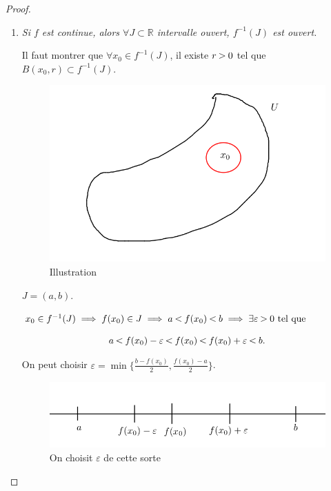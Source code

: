 \documentclass[french]{article}
\newcommand{\lesss}{\rotatebox[origin=c]{90}{$\land$}}
\newcommand{\less}{\ \lesss\ }
\newcommand{\biggg}{\rotatebox[origin=c]{90}{$\lor$}}
\newcommand{\bg}{\ \biggg\ }
\begin{document}
\begin{proof}
  \begin{enumerate}
    \item \emph{Si $f$ est continue, alors $ \forall J \subset \mathbb{R}$ intervalle ouvert, $f ^{-1} (J)$ est ouvert.}

    Il faut montrer que $\forall x_0 \in f ^{-1} (J)$, il existe $r \bg 0$ tel que $B(x_0, r) \subset f ^{-1} (J)$.

    \begin{figure}[h!]
      \centering
      \includegraphics[scale=0.3]{figures/recip_ouvert.png}
      \caption{Illustration}
      \label{}
    \end{figure}

    $J = (a,b)$.

    $x_0 \in f ^{-1} (J) \implies f(x_0) \in J \implies a \less f(x_0) \less b \implies \exists \varepsilon  \bg 0 \text{ tel que } $

    $$ a \less f(x_0) - \varepsilon \less f(x_0) \less f(x_0) + \varepsilon \less b.$$

    On peut choisir $\varepsilon = \min \{ \frac{b-f(x_0)}{2}, \frac{f(x_0)-a}{2} \} $.

    \begin{figure}[h!]
      \centering
      \includegraphics[scale=0.3]{figures/demo_prop_1.png}
      \caption{On choisit $\varepsilon $ de cette sorte}
      \label{}
    \end{figure}


\end{enumerate}
\end{proof}
\end{document}
